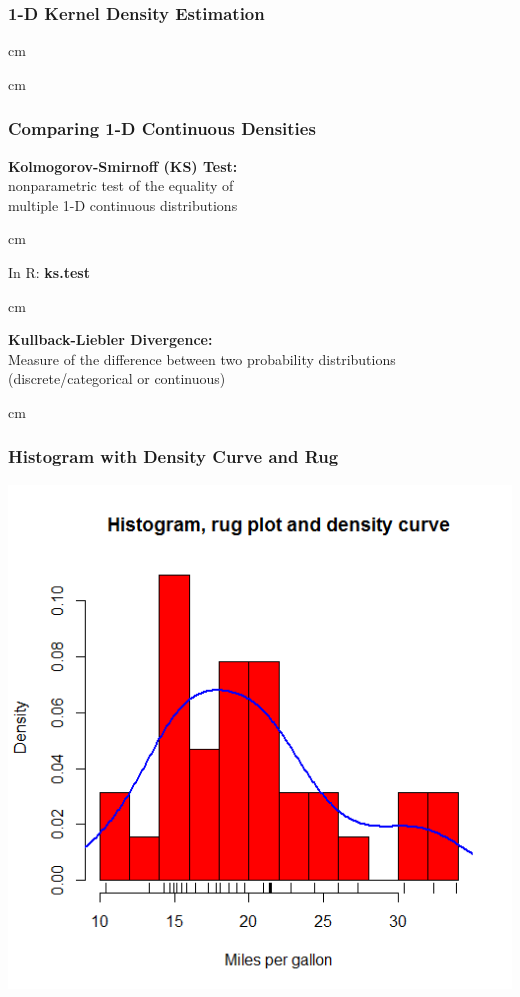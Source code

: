 \documentclass{beamer} %
\begin{document}
\begin{frame}\frametitle{1-D Kernel Density Estimation}
	\small
	
	
	 cm
	
\end{frame}


\begin{frame}
	\small
	
	
	 cm
	
\end{frame}





\begin{frame}\frametitle{Comparing 1-D Continuous Densities}
	\centering
	\textbf{Kolmogorov-Smirnoff (KS) Test:}  \\nonparametric test of the equality of\\ multiple 1-D continuous distributions
	
	 cm
	
	In R:  \textbf{ks.test}
	
	 cm
	
	\textbf{Kullback-Liebler Divergence:}  \\ Measure of the difference between two probability distributions \\ (discrete/categorical or continuous)
	
	 cm
	
\end{frame}




\begin{frame}\frametitle{Histogram with Density Curve and Rug}
	\centering
	\includegraphics[width=0.8\linewidth]{hist-rug-dens.png}
\end{frame}
\end{document}
